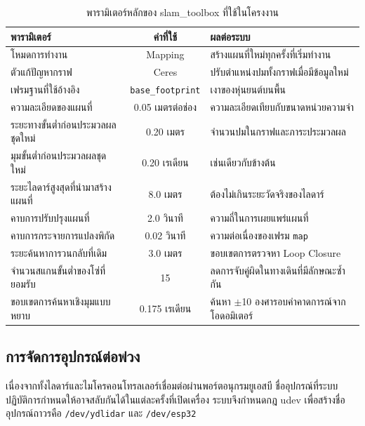 \documentclass[a4paper,12pt]{report}
\begin{document}
\begin{table}[htbp]
\centering
\caption[พารามิเตอร์หลักของ slam\_toolbox ที่ใช้ในโครงงาน (บทที่ 4)]{พารามิเตอร์หลักของ slam\_toolbox ที่ใช้ในโครงงาน}
\label{tab:slamparam}
\small
\begin{tabularx}{\textwidth}{|>{\raggedright\arraybackslash}p{5.2cm}|c|X|}
\hline
\textbf{พารามิเตอร์} & \textbf{ค่าที่ใช้} & \textbf{ผลต่อระบบ} \\
\hline
โหมดการทำงาน & Mapping & สร้างแผนที่ใหม่ทุกครั้งที่เริ่มทำงาน \\
\hline
ตัวแก้ปัญหากราฟ & Ceres & ปรับตำแหน่งปมทั้งกราฟเมื่อมีข้อมูลใหม่ \\
\hline
เฟรมฐานที่ใช้อ้างอิง & \texttt{base\_footprint} & เงาของหุ่นยนต์บนพื้น \\
\hline
ความละเอียดของแผนที่ & 0.05 เมตรต่อช่อง & ความละเอียดเทียบกับขนาดหน่วยความจำ \\
\hline
ระยะทางขั้นต่ำก่อนประมวลผลชุดใหม่ & 0.20 เมตร & จำนวนปมในกราฟและภาระประมวลผล \\
\hline
มุมขั้นต่ำก่อนประมวลผลชุดใหม่ & 0.20 เรเดียน & เช่นเดียวกับข้างต้น \\
\hline
ระยะไลดาร์สูงสุดที่นำมาสร้างแผนที่ & 8.0 เมตร & ต้องไม่เกินระยะวัดจริงของไลดาร์ \\
\hline
คาบการปรับปรุงแผนที่ & 2.0 วินาที & ความถี่ในการเผยแพร่แผนที่ \\
\hline
คาบการกระจายการแปลงพิกัด & 0.02 วินาที & ความต่อเนื่องของเฟรม \texttt{map} \\
\hline
ระยะค้นหาการวนกลับที่เดิม & 3.0 เมตร & ขอบเขตการตรวจหา Loop Closure \\
\hline
จำนวนสแกนขั้นต่ำของโซ่ที่ยอมรับ & 15 & ลดการจับคู่ผิดในทางเดินที่มีลักษณะซ้ำกัน \\
\hline
ขอบเขตการค้นหาเชิงมุมแบบหยาบ & 0.175 เรเดียน & ค้นหา $\pm$10 องศารอบค่าคาดการณ์จากโอดอมิเตอร์ \\
\hline
\end{tabularx}
\end{table}


\subsection{การจัดการอุปกรณ์ต่อพ่วง}

เนื่องจากทั้งไลดาร์และไมโครคอนโทรลเลอร์เชื่อมต่อผ่านพอร์ตอนุกรมยูเอสบี
ชื่ออุปกรณ์ที่ระบบปฏิบัติการกำหนดให้อาจสลับกันได้ในแต่ละครั้งที่เปิดเครื่อง
ระบบจึงกำหนดกฎ udev เพื่อสร้างชื่ออุปกรณ์ถาวรคือ \texttt{/dev/ydlidar}
และ \texttt{/dev/esp32}
\end{document}

